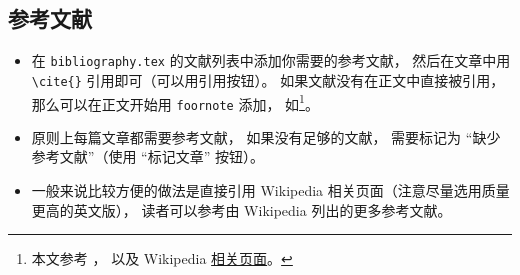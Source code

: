 \subsection{参考文献}
\begin{itemize}
\item 在 \verb`bibliography.tex` 的文献列表中添加你需要的参考文献， 然后在文章中用 \verb`\cite{}` 引用即可（可以用引用按钮）。 如果文献没有在正文中直接被引用， 那么可以在正文开始用 \verb`foornote` 添加， 如\footnote{本文参考 \cite{GriffE}， \cite{GriffQ} 以及 Wikipedia \href{https://www.wikipedia.org/}{相关页面}。}。
\item 原则上每篇文章都需要参考文献， 如果没有足够的文献， 需要标记为 “缺少参考文献”（使用 “标记文章” 按钮）。
\item 一般来说比较方便的做法是直接引用 Wikipedia 相关页面（注意尽量选用质量更高的英文版）， 读者可以参考由 Wikipedia 列出的更多参考文献。
\end{itemize}
